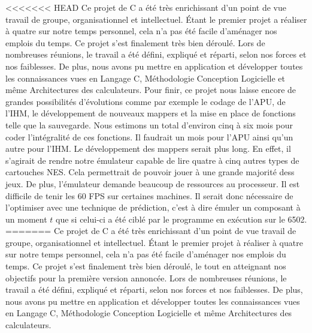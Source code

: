<<<<<<< HEAD
Ce projet de C a été très enrichissant d'un point de vue travail de groupe, organisationnel et intellectuel. Étant le premier projet a réaliser à quatre sur notre temps personnel, cela n'a pas été facile d'aménager nos emplois du temps. Ce projet s'est finalement très bien déroulé. Lors de nombreuses réunions, le travail a été défini, expliqué et réparti, selon nos forces et nos faiblesses. De plus, nous avons pu mettre en application et développer toutes les connaissances vues en Langage C, Méthodologie Conception Logicielle et même Architectures des calculateurs. Pour finir, ce projet nous laisse encore de grandes possibilités d'évolutions comme par exemple le codage de l'APU, de l'IHM, le développement de nouveaux mappers et la mise en place de fonctions telle que la sauvegarde. Nous estimons un total d'environ cinq à six mois pour coder l'intégralité de ces fonctions. Il faudrait un mois pour l'APU ainsi qu'un autre pour l'IHM. Le développement des mappers serait plus long. En effet, il s'agirait de rendre notre émulateur capable de lire quatre à cinq autres types de cartouches NES. Cela permettrait de pouvoir jouer à une grande majorité dess jeux. De plus, l'émulateur demande beaucoup de ressources au processeur. Il est difficile de tenir les 60 FPS sur certaines machines. Il serait donc nécessaire de l'optimiser avec une technique de prédiction, c'est à dire émuler un composant à un moment $t$ que si celui-ci a été ciblé par le programme en exécution sur le 6502.
=======
Ce projet de C a été très enrichissant d'un point de vue travail de groupe, organisationnel et intellectuel. Étant le premier projet à réaliser à quatre sur notre temps personnel, cela n'a pas été facile d'aménager nos emplois du temps. Ce projet s'est finalement très bien déroulé, le tout en atteignant nos objectifs pour la première version annoncée. Lors de nombreuses réunions, le travail a été défini, expliqué et réparti, selon nos forces et nos faiblesses. De plus, nous avons pu mettre en application et développer toutes les connaissances vues en Langage C, Méthodologie Conception Logicielle et même Architectures des calculateurs.

